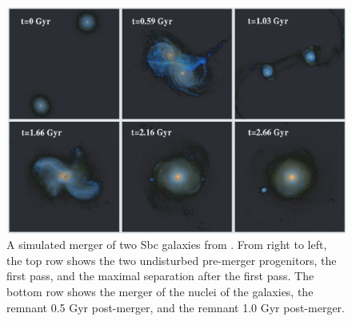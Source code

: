 \documentclass[twocolumn]{aastex631}
\begin{document}
\begin{figure}[h!]
    \centering
    \centering
    \includegraphics[width=\linewidth]{merger.png}
    \caption{
        A simulated merger of two Sbc galaxies from \cite{Lotz+2008}.
        From right to left, the top row shows the two undisturbed pre-merger progenitors, the first pass, and the maximal separation after the first pass.
        The bottom row shows the merger of the nuclei of the galaxies, the remnant 0.5 Gyr post-merger, and the remnant 1.0 Gyr post-merger.
        }
    \label{fig:merger}
\end{figure}
\end{document}
